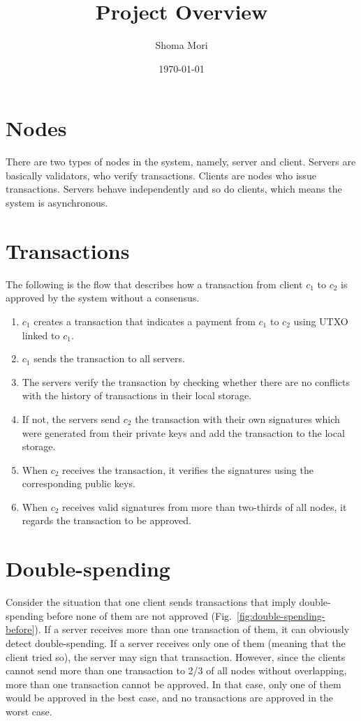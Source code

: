 \documentclass[a4j,10.5pt,uplatex,twocolumn]{article}
\title{Project Overview}
\author{Shoma Mori}
\date{\today}
\begin{document}
\maketitle

\section{Nodes}
There are two types of nodes in the system, namely, server and client.
Servers are basically validators, who verify transactions.
Clients are nodes who issue transactions.
Servers behave independently and so do clients, which means the system is asynchronous.

\section{Transactions}
The following is the flow that describes how a transaction from client $c_1$ to $c_2$ is approved by the system without a consensus.

\begin{enumerate}
    \item $c_1$ creates a transaction that indicates a payment from $c_1$ to $c_2$ using UTXO linked to $c_1$.
    \item $c_1$ sends the transaction to all servers.
    \item The servers verify the transaction by checking whether there are no conflicts with the history of transactions in their local storage.
    \item If not, the servers send $c_2$ the transaction with their own signatures which were generated from their private keys and add the transaction to the local storage.
    \item When $c_2$ receives the transaction, it verifies the signatures using the corresponding public keys.
    \item When $c_2$ receives valid signatures from more than two-thirds of all nodes, it regards the transaction to be approved.
\end{enumerate}

\section{Double-spending}
Consider the situation that one client sends transactions that imply double-spending before none of them are not approved (Fig.~\ref{fig:double-spending-before}).
If a server receives more than one transaction of them, it can obviously detect double-spending.
If a server receives only one of them (meaning that the client tried so), the server may sign that transaction.
However, since the clients cannot send more than one transaction to 2/3 of all nodes without overlapping, more than one transaction cannot be approved.
In that case, only one of them would be approved in the best case, and no transactions are approved in the worst case.
\end{document}
